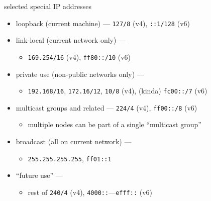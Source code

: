 \begin{frame}{selected special IP addresses}
\begin{itemize}
\item loopback (current machine) --- {\tt 127/8} (v4), {\tt ::1/128} (v6)
\item link-local (current network only) ---
    \begin{itemize}
    \item {\tt 169.254/16} (v4), {\tt ff80::/10} (v6)
    \end{itemize}
\item private use (non-public networks only) --- \\
    \begin{itemize}
    \item {\tt 192.168/16}, {\tt 172.16/12}, {\tt 10/8} (v4), (kinda) {\tt fc00::/7} (v6)
    \end{itemize}
\item multicast groups and related --- {\tt 224/4} (v4), {\tt ff00::/8} (v6)
    \begin{itemize}
    \item multiple nodes can be part of a single ``multicast group''
    \end{itemize}
\item broadcast (all on current network) --- 
    \begin{itemize}
    \item {\tt 255.255.255.255}, {\tt ff01::1}
    \end{itemize}
\item ``future use'' --- 
    \begin{itemize}
    \item rest of {\tt 240/4} (v4), {\tt 4000::}---{\tt efff::} (v6)
    \end{itemize}
\end{itemize}
\end{frame}
